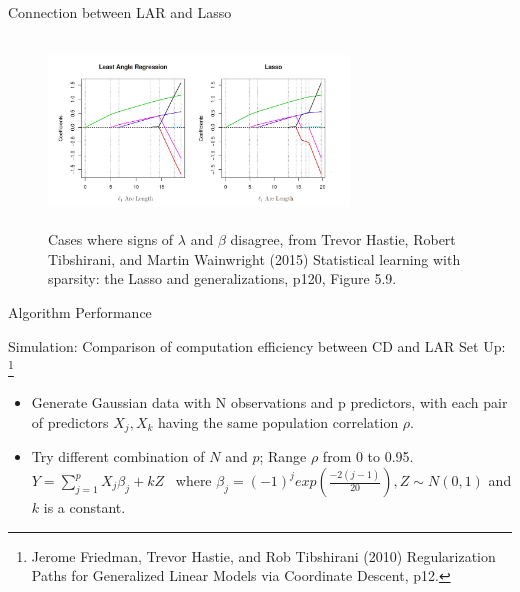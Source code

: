 \documentclass[handout]{beamer}
\begin{document}
\begin{frame}{Connection between LAR and Lasso}
\begin{figure}[h]
\centering
\includegraphics[width=8cm,height=5cm]{img/LARLasso}
\caption{Cases where signs of \(\lambda\) and \(\beta\) disagree, from Trevor Hastie, Robert Tibshirani, and Martin Wainwright (2015) Statistical learning with sparsity: the Lasso and generalizations, p120, Figure 5.9.}
\end{figure}
\end{frame}

\begin{frame}{Algorithm Performance}
\begin{block} {Simulation: Comparison of computation efficiency between CD and LAR}
\vspace*{3mm}
    Set Up: \footnote{Jerome Friedman, Trevor Hastie, and Rob Tibshirani (2010) Regularization Paths for Generalized Linear Models via Coordinate Descent, p12.}
    \begin{itemize}
        \item Generate Gaussian data with N observations and p predictors, with each pair of predictors \(X_j,X_k\) having the same population correlation \(\rho\).
        \item  Try different combination of $N$ and $p$; Range \(\rho\) from 0 to 0.95.\\
        \(Y=\sum_{j=1}^{p}X_j\beta_{j}+kZ\) \ where \( \beta_j= (-1)^j exp(\frac{-2(j-1)}{20}), Z \sim N(0,1)\) and $k$ is a constant.
    \end{itemize}
\end{block}  

\end{frame}
\end{document}
